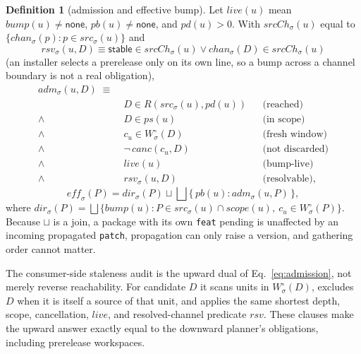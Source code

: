 \documentclass[10pt,conference]{IEEEtran}
\theoremstyle{definition}
\newtheorem{definition}{Definition}
\newcommand{\code}[1]{\texttt{#1}}
\begin{document}
\begin{definition}[admission and effective bump]
\label{def:adm}
Let $\mathit{live}(u)$ mean $\mathit{bump}(u)\neq\mathsf{none}$,
$\mathit{pb}(u)\neq\mathsf{none}$, and $\mathit{pd}(u)>0$. With
$\mathit{srcCh}_\sigma(u)$ equal to
$\{\mathit{chan}_\sigma(p) : p \in \mathit{src}_\sigma(u)\}$ and
\begin{equation}
  \mathit{rsv}_\sigma(u,D) \equiv \mathsf{stable} \in
  \mathit{srcCh}_\sigma(u) \lor \mathit{chan}_\sigma(D) \in
  \mathit{srcCh}_\sigma(u)
  \label{eq:resolvable}
\end{equation}
(an installer selects a prerelease only on its own line, so a bump
across a channel boundary is not a real obligation),
\begin{equation}
\label{eq:admission}
\begin{aligned}
  \mathit{adm}_\sigma(u,D) \;\equiv\; & \\[-0pt]
     & D \in R(\mathit{src}_\sigma(u), \mathit{pd}(u))
     &\!\!& \text{(reached)} \\
  \wedge\;\; & D \in \mathit{ps}(u)
     &\!\!& \text{(in scope)} \\
  \wedge\;\; & c_u \in W^\circ_\sigma(D)
     &\!\!& \text{(fresh window)} \\
  \wedge\;\; & \neg\,\mathit{canc}(c_u, D)
     &\!\!& \text{(not discarded)} \\
  \wedge\;\; & \mathit{live}(u)
     &\!\!& \text{(bump-live)} \\
  \wedge\;\; & \mathit{rsv}_\sigma(u, D)
     &\!\!& \text{(resolvable),}
\end{aligned}
\end{equation}
\begin{equation}
\label{eq:effective}
  \mathit{eff}_\sigma(P) = \mathit{dir}_\sigma(P) \sqcup
  \bigsqcup \{\, \mathit{pb}(u) : \mathit{adm}_\sigma(u,P) \,\},
\end{equation}
where $\mathit{dir}_\sigma(P) = \bigsqcup\{\mathit{bump}(u) : P \in
\mathit{src}_\sigma(u) \cap \mathit{scope}(u),\ c_u \in W^\circ_\sigma(P)\}$.
Because $\sqcup$ is a join, a package with its own \code{feat} pending
is unaffected by an incoming propagated \code{patch}, propagation can
only raise a version, and gathering order cannot matter.
\end{definition}

The consumer-side staleness audit is the upward dual of
Eq.~\ref{eq:admission}, not merely reverse reachability. For candidate $D$
it scans units in $W^\circ_\sigma(D)$, excludes $D$ when it is itself a
source of that unit, and applies the same shortest depth, scope,
cancellation, $\mathit{live}$, and resolved-channel predicate $\mathit{rsv}$. These clauses
make the upward answer exactly equal to the downward planner's obligations,
including prerelease workspaces.
\end{document}
